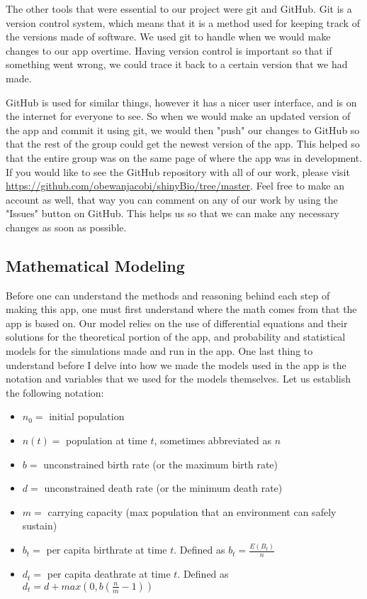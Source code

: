 \documentclass{article}\usepackage[]{graphicx}\usepackage[]{color}
\begin{document}
The other tools that were essential to our project were git and GitHub. Git is a version control system, which means that it is a method used for keeping track of the versions made of software. We used git to handle when we would make changes to our app overtime. Having version control is important so that if something went wrong, we could trace it back to a certain version that we had made. 

GitHub is used for similar things, however it has a nicer user interface, and is on the internet for everyone to see. So when we would make an updated version of the app and commit it using git, we would then "push" our changes to GitHub so that the rest of the group could get the newest version of the app. This helped so that the entire group was on the same page of where the app was in development. If you would like to see the GitHub repository with all of our work, please visit \url{https://github.com/obewanjacobi/shinyBio/tree/master}. Feel free to make an account as well, that way you can comment on any of our work by using the "Issues" button on GitHub. This helps us so that we can make any necessary changes as soon as possible.






\subsection{Mathematical Modeling}

Before one can understand the methods and reasoning behind each step of making this app, one must first understand where the math comes from that the app is based on. Our model relies on the use of differential equations and their solutions for the theoretical portion of the app, and probability and statistical models for the simulations made and run in the app. One last thing to understand before I delve into how we made the models used in the app is the notation and variables that we used for the models themselves. Let us establish the following notation:

\begin{itemize}
\item \(n_0 =\) initial population

\item \(n(t) =\) population at time \(t\), sometimes abbreviated as \(n\)

\item \(b =\) unconstrained birth rate (or the maximum birth rate)

\item \(d =\) unconstrained death rate (or the minimum death rate)

\item \(m =\) carrying capacity (max population that an environment can safely sustain)

\item \(b_t =\) per capita birthrate at time \(t\). Defined as \(b_t = \frac{E(B_t)}{n}\)

\item \(d_t =\) per capita deathrate at time \(t\). Defined as \(d_t = d + max(0, b(\frac{n}{m} - 1))\)
\end{itemize}
\end{document}
